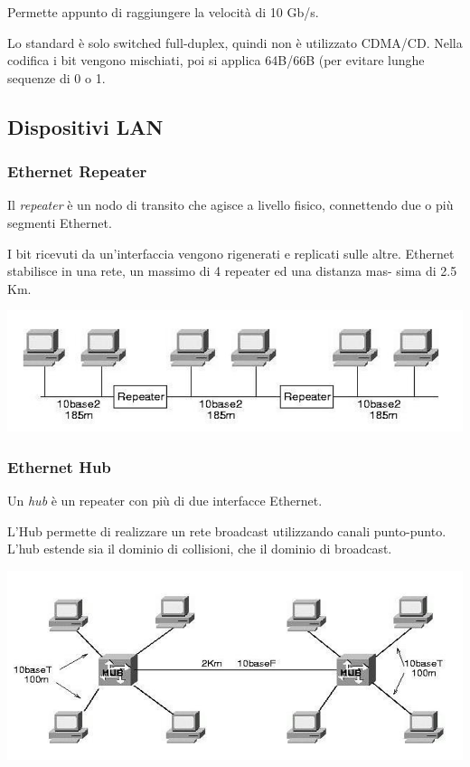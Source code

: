             Permette appunto di raggiungere la velocità di 10 Gb/s.

            Lo standard è solo switched full-duplex, quindi non è utilizzato CDMA/CD. Nella codifica i bit vengono mischiati, poi si applica 64B/66B (per evitare lunghe sequenze di 0 o 1.

    \subsection{Dispositivi LAN}
        \subsubsection{Ethernet Repeater}
            Il \textit{repeater} è un nodo di transito che agisce a livello fisico, connettendo due o più segmenti Ethernet.
        
            I bit ricevuti da un'interfaccia vengono rigenerati e replicati sulle altre. Ethernet stabilisce in una rete, un massimo di 4 repeater ed una distanza mas- sima di 2.5 Km.

            \begin{center}
                \includegraphics[scale=0.4]{chapters/3/assets/schema_p.png}
            \end{center}

        \subsubsection{Ethernet Hub}
            Un \textit{hub} è un repeater con più di due interfacce Ethernet.
            
            L'Hub permette di realizzare un rete broadcast utilizzando canali punto-punto. L'hub estende sia il dominio di collisioni, che il dominio di broadcast.

            \begin{center}
                \includegraphics[scale=0.36]{chapters/3/assets/schema_q.png}
            \end{center}

